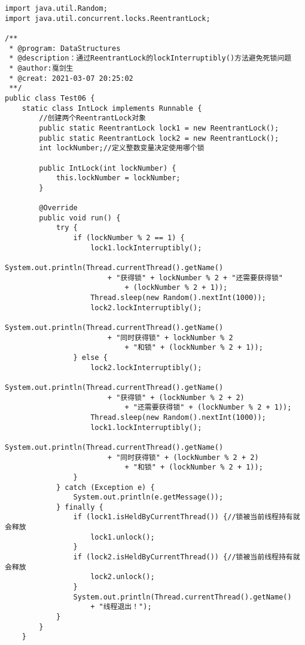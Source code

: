 \documentclass[a4paper]{report}
\begin{document}
\begin{Verbatim}[frame=single,numbersep=5pt,xleftmargin=1.5em,xrightmargin=1.5em]
import java.util.Random;
import java.util.concurrent.locks.ReentrantLock;

/**
 * @program: DataStructures
 * @description：通过ReentrantLock的lockInterruptibly()方法避免死锁问题
 * @author:戛剑生
 * @creat: 2021-03-07 20:25:02
 **/
public class Test06 {
    static class IntLock implements Runnable {
        //创建两个ReentrantLock对象
        public static ReentrantLock lock1 = new ReentrantLock();
        public static ReentrantLock lock2 = new ReentrantLock();
        int lockNumber;//定义整数变量决定使用哪个锁

        public IntLock(int lockNumber) {
            this.lockNumber = lockNumber;
        }

        @Override
        public void run() {
            try {
                if (lockNumber % 2 == 1) {
                    lock1.lockInterruptibly();
                    System.out.println(Thread.currentThread().getName()
                        + "获得锁" + lockNumber % 2 + "还需要获得锁"
                            + (lockNumber % 2 + 1));
                    Thread.sleep(new Random().nextInt(1000));
                    lock2.lockInterruptibly();
                    System.out.println(Thread.currentThread().getName()
                        + "同时获得锁" + lockNumber % 2
                            + "和锁" + (lockNumber % 2 + 1));
                } else {
                    lock2.lockInterruptibly();
                    System.out.println(Thread.currentThread().getName()
                        + "获得锁" + (lockNumber % 2 + 2)
                            + "还需要获得锁" + (lockNumber % 2 + 1));
                    Thread.sleep(new Random().nextInt(1000));
                    lock1.lockInterruptibly();
                    System.out.println(Thread.currentThread().getName()
                        + "同时获得锁" + (lockNumber % 2 + 2)
                            + "和锁" + (lockNumber % 2 + 1));
                }
            } catch (Exception e) {
                System.out.println(e.getMessage());
            } finally {
                if (lock1.isHeldByCurrentThread()) {//锁被当前线程持有就会释放
                    lock1.unlock();
                }
                if (lock2.isHeldByCurrentThread()) {//锁被当前线程持有就会释放
                    lock2.unlock();
                }
                System.out.println(Thread.currentThread().getName()
                    + "线程退出！");
            }
        }
    }


\end{Verbatim}
\end{document}
